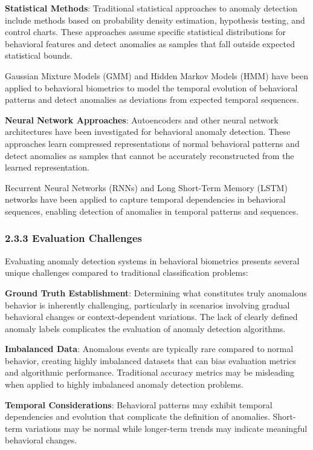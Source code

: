 \documentclass[
  11pt,
  a4paper,
]{article}
\begin{document}
\textbf{Statistical Methods}: Traditional statistical approaches to
anomaly detection include methods based on probability density
estimation, hypothesis testing, and control charts. These approaches
assume specific statistical distributions for behavioral features and
detect anomalies as samples that fall outside expected statistical
bounds.

Gaussian Mixture Models (GMM) and Hidden Markov Models (HMM) have been
applied to behavioral biometrics to model the temporal evolution of
behavioral patterns and detect anomalies as deviations from expected
temporal sequences.

\textbf{Neural Network Approaches}: Autoencoders and other neural
network architectures have been investigated for behavioral anomaly
detection. These approaches learn compressed representations of normal
behavioral patterns and detect anomalies as samples that cannot be
accurately reconstructed from the learned representation.

Recurrent Neural Networks (RNNs) and Long Short-Term Memory (LSTM)
networks have been applied to capture temporal dependencies in
behavioral sequences, enabling detection of anomalies in temporal
patterns and sequences.

\subsubsection{2.3.3 Evaluation Challenges}\label{evaluation-challenges}

Evaluating anomaly detection systems in behavioral biometrics presents
several unique challenges compared to traditional classification
problems:

\textbf{Ground Truth Establishment}: Determining what constitutes truly
anomalous behavior is inherently challenging, particularly in scenarios
involving gradual behavioral changes or context-dependent variations.
The lack of clearly defined anomaly labels complicates the evaluation of
anomaly detection algorithms.

\textbf{Imbalanced Data}: Anomalous events are typically rare compared
to normal behavior, creating highly imbalanced datasets that can bias
evaluation metrics and algorithmic performance. Traditional accuracy
metrics may be misleading when applied to highly imbalanced anomaly
detection problems.

\textbf{Temporal Considerations}: Behavioral patterns may exhibit
temporal dependencies and evolution that complicate the definition of
anomalies. Short-term variations may be normal while longer-term trends
may indicate meaningful behavioral changes.
\end{document}
